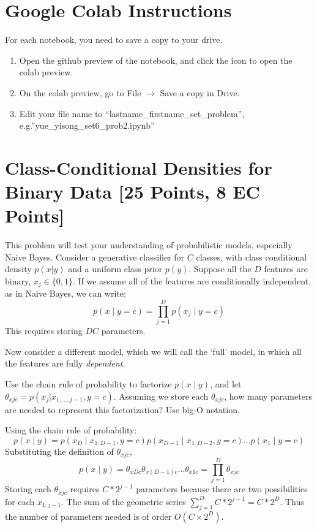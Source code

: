 \section*{Google Colab Instructions}
For each notebook, you need to save a copy to your drive.
\begin{enumerate}
	\item Open the github preview of the notebook, and click the icon to open the colab preview.
	\item On the colab preview, go to File $\rightarrow$ Save a copy in Drive.
	\item Edit your file name to “lastname_firstname_set_problem”, e.g.”yue_yisong_set6_prob2.ipynb”
\end{enumerate}

\newpage

\section{Class-Conditional Densities for Binary Data [25 Points, 8 EC Points]}
This problem will test your understanding of probabilistic models, especially Naive Bayes.
Consider a generative classifier for $C$ classes, with class conditional density $p(x | y)$ and a uniform class prior $p(y)$. Suppose all the $D$ features are binary, $x_j \in \{0, 1 \}$. If we assume all of the features are conditionally independent, as in Naive Bayes, we can write:
$$p(x \mid y = c) = \prod_{j=1}^D p(x_j \mid y = c) $$
This requires storing $DC$ parameters. 

Now consider a different model, which we will call the `full' model, in which all the features are fully \textit{dependent}.

\problem[9] Use the chain rule of probability to factorize $p(x \mid y)$, and let $\theta_{xjc} = p(x_j | x_{1, \ldots, j - 1}, y = c)$. Assuming we store each $\theta_{xjc}$, how many parameters are needed to represent this factorization? Use big-O notation. 

\begin{solution}
  Using the chain rule of probability:
  \begin{equation}
    p(x \mid y) = p(x_D \mid x_{1:D-1}, y = c) p(x_{D-1} \mid x_{1:D-2}, y = c) ... p(x_1 \mid y = c)
  \end{equation}
  Substituting the definition of $\theta_{xjc}$,
  \begin{equation}
    p(x \mid y) = \theta_{xDc} \theta_{x(D-1)c} ... \theta_{x1c} = \prod_{j=1}^{D} \theta_{xjc}
  \end{equation}
  Storing each $\theta_{xjc}$ requires $C*2^{j-1}$ parameters because there are two possibilities for each $x_{1:j-1}$. The sum of the geometric series $\sum_{j=1}^{D} C*2^{j-1} = C*2^D$. Thus the number of parameters needed is of order $O(C \times 2^D)$.
\end{solution}

